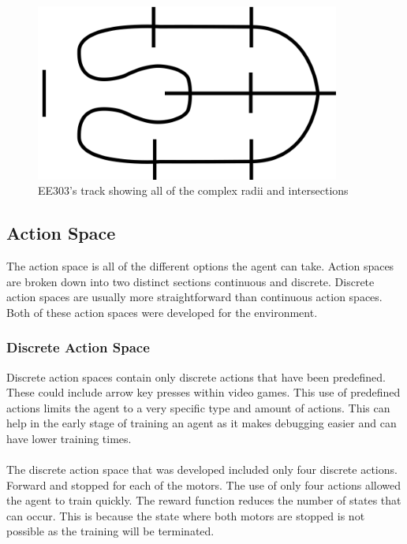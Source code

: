 \documentclass[a4paper,12pt]{article}
\begin{document}
 \begin{figure}[H]
 \centering
 \includegraphics[width=10cm]{imgs/Track.png}
 \caption{EE303's track showing all of the complex radii and intersections \cite{KevinMcGuinness}}
 \label{fig:Track}
 \end{figure}

\subsection{Action Space}
The action space is all of the different options the agent can take. Action spaces are broken down into two distinct sections continuous and discrete. Discrete action spaces are usually more straightforward than continuous action spaces. Both of these action spaces were developed for the environment. 

\subsubsection{Discrete Action Space}
Discrete action spaces contain only discrete actions that have been predefined. These could include arrow key presses within video games. This use of predefined actions limits the agent to a very specific type and amount of actions. This can help in the early stage of training an agent as it makes debugging easier and can have lower training times.
\\\\
The discrete action space that was developed included only four discrete actions. Forward and stopped for each of the motors. The use of only four actions allowed the agent to train quickly. The reward function reduces the number of states that can occur. This is because the state where both motors are stopped is not possible as the training will be terminated. 
\end{document}
